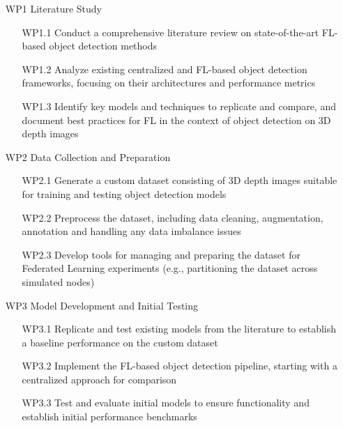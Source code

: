 \documentclass[thesis]{mas_proposal}
\begin{document}
\begin{enumerate}

      \item[WP1] Literature Study
            \begin{itemize}
                  \item[WP1.1] Conduct a comprehensive literature review on state-of-the-art FL-based object detection methods
                  \item[WP1.2] Analyze existing centralized and FL-based object detection frameworks, focusing on their architectures and performance metrics
                  \item[WP1.3] Identify key models and techniques to replicate and compare, and document best practices for FL in the context of object detection on 3D depth images
            \end{itemize}

      \item[WP2] Data Collection and Preparation
            \begin{itemize}
                  \item[WP2.1] Generate a custom dataset consisting of 3D depth images suitable for training and testing object detection models
                  \item[WP2.2] Preprocess the dataset, including data cleaning, augmentation, annotation and handling any data imbalance issues
                  \item[WP2.3] Develop tools for managing and preparing the dataset for Federated Learning experiments (e.g., partitioning the dataset across simulated nodes)
            \end{itemize}

      \item[WP3] Model Development and Initial Testing
            \begin{itemize}
                  \item[WP3.1] Replicate and test existing models from the literature to establish a baseline performance on the custom dataset
                  \item[WP3.2] Implement the FL-based object detection pipeline, starting with a centralized approach for comparison
                  \item[WP3.3] Test and evaluate initial models to ensure functionality and establish initial performance benchmarks
            \end{itemize}


\end{enumerate}
\end{document}

